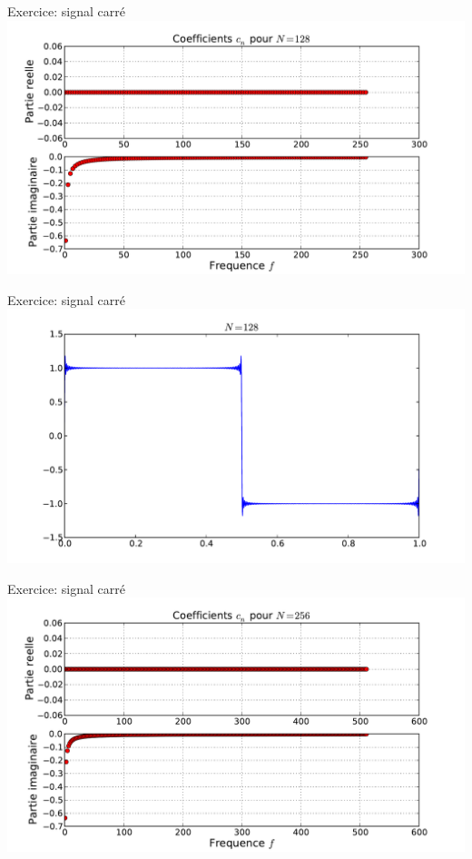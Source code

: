 \documentclass[8pt,a4paper]{beamer}
\begin{document}
\begin{frame}{Exercice: signal carré}
\includegraphics[width=1.\textwidth]{figures/serieF_carre_c_128.pdf} \\
\end{frame}

\begin{frame}{Exercice: signal carré}
\includegraphics[width=1.\textwidth]{figures/serieF_carre_128.pdf}\\
\end{frame}

\begin{frame}{Exercice: signal carré}
\includegraphics[width=1.\textwidth]{figures/serieF_carre_c_256.pdf} \\
\end{frame}
\end{document}
